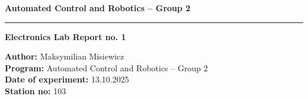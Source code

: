 
\noindent\textbf{Automated Control and Robotics – Group 2}\\[-0.2em]
\rule{\textwidth}{0.4pt}
\vspace{1cm}

\begin{center}
{\Huge \textbf{Electronics Lab Report no. 1}}\\[1.5cm]
\end{center}

\begin{flushleft}
\textbf{Author:} Maksymilian Misiewicz\\[0.3em]
\textbf{Program:} Automated Control and Robotics – Group 2\\[0.3em]
\textbf{Date of experiment:} 13.10.2025\\[0.3em]
\textbf{Station no:} 103 
\end{flushleft}
